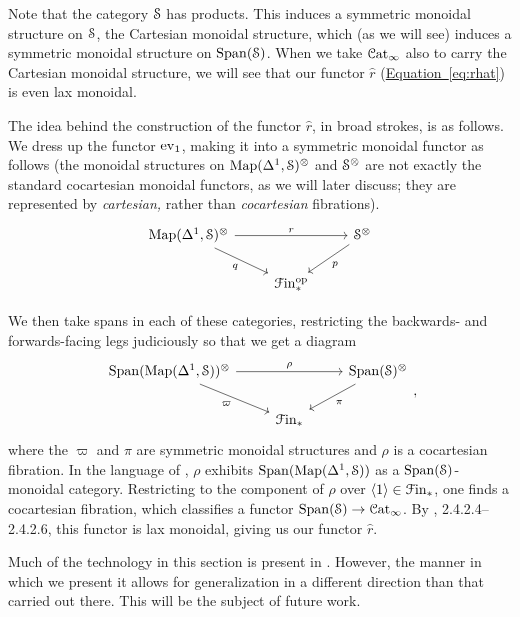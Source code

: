 \documentclass[main.tex]{subfiles}
\begin{document}
Note that the category $\S$ has products. This induces a symmetric monoidal structure on $\S$, the Cartesian monoidal structure, which (as we will see) induces a symmetric monoidal structure on $\Span(\S)$. When we take $\Cat_{\infty}$ also to carry the Cartesian monoidal structure, we will see that our functor $\hat{r}$ (\hyperref[eq:rhat]{Equation~\ref*{eq:rhat}}) is even lax monoidal.

The idea behind the construction of the functor $\hat{r}$, in broad strokes, is as follows. We dress up the functor $\ev_{1}$, making it into a symmetric monoidal functor as follows (the monoidal structures on $\Map(\Delta^{1}, \S)^{\otimes}$ and $\S^{\otimes}$ are not exactly the standard cocartesian monoidal functors, as we will later discuss; they are represented by \emph{cartesian,} rather than \emph{cocartesian} fibrations).
\begin{equation*}
  \begin{tikzcd}
    \Map(\Delta^{1}, \S)^{\otimes}
    \arrow[rr, "r"]
    \arrow[dr, swap, "q"]
    && \S^{\otimes}
    \arrow[dl, "p"]
    \\
    & \Finp\op
  \end{tikzcd}
\end{equation*}

We then take spans in each of these categories, restricting the backwards- and forwards-facing legs judiciously so that we get a diagram
\begin{equation*}
  \begin{tikzcd}
    \Span(\Map(\Delta^{1}, \S))^{\otimes}
    \arrow[rr, "\rho"]
    \arrow[dr, swap, "\varpi"]
    && \Span(\S)^{\otimes}
    \arrow[dl, "\pi"]
    \\
    & \Finp
  \end{tikzcd},
\end{equation*}
where the $\varpi$ and $\pi$ are symmetric monoidal structures and $\rho$ is a cocartesian fibration. In the language of \cite{luriehigheralgebra}, $\rho$ exhibits $\Span(\Map(\Delta^{1}, \S))$ as a $\Span(\S)$-monoidal category. Restricting to the component of $\rho$ over $\langle 1 \rangle \in \Finp$, one finds a cocartesian fibration, which classifies a functor $\Span(\S) \to \ICat$. By \cite{luriehigheralgebra}, 2.4.2.4--2.4.2.6, this functor is lax monoidal, giving us our functor $\hat{r}$.

Much of the technology in this section is present in \cite{spectralmackeyfunctors2}. However, the manner in which we present it allows for generalization in a different direction than that carried out there. This will be the subject of future work.
\end{document}
